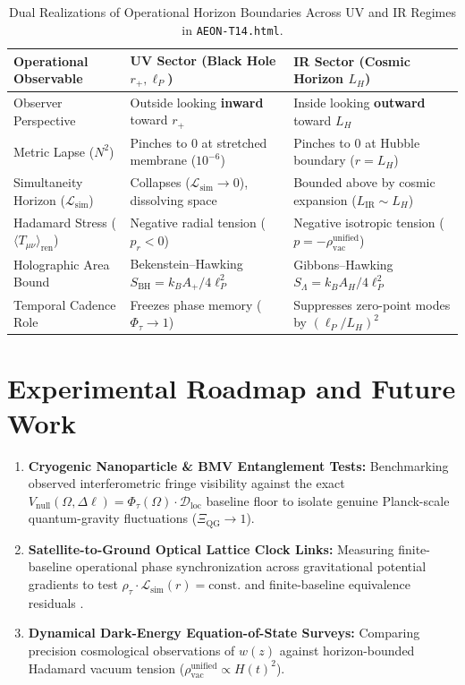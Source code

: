 \documentclass[11pt,a4paper]{article}
\begin{document}
\begin{table}[h!]
\centering
\caption{Dual Realizations of Operational Horizon Boundaries Across UV and IR Regimes in \texttt{AEON-T14.html}.}
\vspace{0.5em}
\small
\begin{tabular}{@{}lll@{}}
\toprule
\textbf{Operational Observable} & \textbf{UV Sector (Black Hole $r_+, \ell_P$)} & \textbf{IR Sector (Cosmic Horizon $L_H$)} \\
\midrule
Observer Perspective & Outside looking \textbf{inward} toward $r_+$ & Inside looking \textbf{outward} toward $L_H$ \\
Metric Lapse ($N^2$) & Pinches to $0$ at stretched membrane ($10^{-6}$) & Pinches to $0$ at Hubble boundary ($r = L_H$) \\
Simultaneity Horizon ($\mathcal{L}_{\mathrm{sim}}$) & Collapses ($\mathcal{L}_{\mathrm{sim}} \to 0$), dissolving space & Bounded above by cosmic expansion ($L_{\mathrm{IR}} \sim L_H$) \\
Hadamard Stress ($\langle T_{\mu\nu} \rangle_{\mathrm{ren}}$) & Negative radial tension ($p_r < 0$) & Negative isotropic tension ($p = -\rho_{\mathrm{vac}}^{\mathrm{unified}}$) \\
Holographic Area Bound & Bekenstein--Hawking $S_{\mathrm{BH}} = k_B A_+ / 4\ell_P^2$ & Gibbons--Hawking $S_\Lambda = k_B A_H / 4\ell_P^2$ \\
Temporal Cadence Role & Freezes phase memory ($\Phi_\tau \to 1$) & Suppresses zero-point modes by $(\ell_P / L_H)^2$ \\
\bottomrule
\end{tabular}
\end{table}

\section{Experimental Roadmap and Future Work}

\begin{enumerate}
    \item \textbf{Cryogenic Nanoparticle \& BMV Entanglement Tests:} Benchmarking observed interferometric fringe visibility against the exact $V_{\mathrm{null}}(\Omega, \Delta\ell) = \Phi_\tau(\Omega)\cdot\mathcal{D}_{\mathrm{loc}}$ baseline floor to isolate genuine Planck-scale quantum-gravity fluctuations ($\Xi_{\mathrm{QG}} \to 1$).
    \item \textbf{Satellite-to-Ground Optical Lattice Clock Links:} Measuring finite-baseline operational phase synchronization across gravitational potential gradients to test $\rho_\tau \cdot \mathcal{L}_{\mathrm{sim}}(r) = \mathrm{const.}$ and finite-baseline equivalence residuals \cite{damasio_p15}.
    \item \textbf{Dynamical Dark-Energy Equation-of-State Surveys:} Comparing precision cosmological observations of $w(z)$ against horizon-bounded Hadamard vacuum tension ($\rho_{\mathrm{vac}}^{\mathrm{unified}} \propto H(t)^2$).
\end{enumerate}
\end{document}
